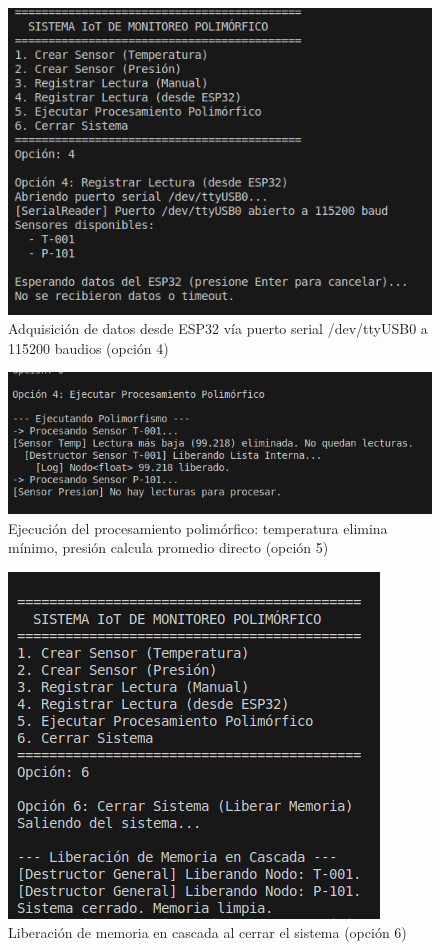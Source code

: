 \documentclass[conference]{IEEEtran}
\begin{document}
\begin{figure}[h]
    \centering
    \includegraphics[width=\RelacionFiguradoscolumnas\columnwidth]{registro_lectura_ESP32.png}
    \caption{Adquisición de datos desde ESP32 vía puerto serial /dev/ttyUSB0 a 115200 baudios (opción 4)}
    \label{fig:arduino}
\end{figure}

\begin{figure}[h]
    \centering
    \includegraphics[width=\RelacionFiguradoscolumnas\columnwidth]{procesamiento_polimorfico.png}
    \caption{Ejecución del procesamiento polimórfico: temperatura elimina mínimo, presión calcula promedio directo (opción 5)}
    \label{fig:procesamiento}
\end{figure}

\begin{figure}[h]
    \centering
    \includegraphics[width=\RelacionFiguradoscolumnas\columnwidth]{liberar_memoria.png}
    \caption{Liberación de memoria en cascada al cerrar el sistema (opción 6)}
    \label{fig:destruccion}
\end{figure}
\end{document}
